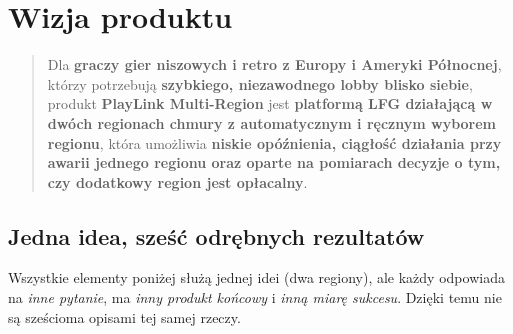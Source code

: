 \documentclass[12pt,a4paper]{article}
\begin{document}
\section{Wizja produktu}
\begin{quote}
Dla \textbf{graczy gier niszowych i retro z Europy i Ameryki Północnej}, którzy
potrzebują \textbf{szybkiego, niezawodnego lobby blisko siebie}, produkt
\textbf{PlayLink Multi-Region} jest \textbf{platformą LFG działającą w dwóch
regionach chmury z automatycznym i ręcznym wyborem regionu}, która umożliwia
\textbf{niskie opóźnienia, ciągłość działania przy awarii jednego regionu oraz
oparte na pomiarach decyzje o tym, czy dodatkowy region jest opłacalny}.
\end{quote}

\subsection{Jedna idea, sześć odrębnych rezultatów}
Wszystkie elementy poniżej służą jednej idei (dwa regiony), ale każdy odpowiada na
\emph{inne pytanie}, ma \emph{inny produkt końcowy} i \emph{inną miarę sukcesu}.
Dzięki temu nie są sześcioma opisami tej samej rzeczy.
\end{document}
